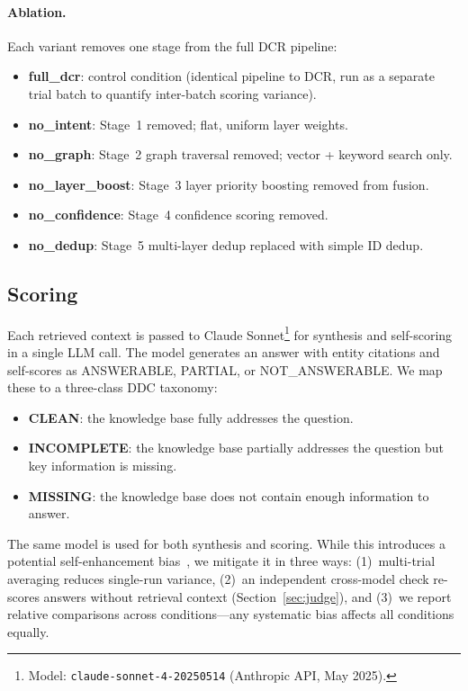 \documentclass[11pt,a4paper]{article}
\begin{document}
\paragraph{Ablation.} Each variant removes one stage from the full DCR pipeline:
\begin{itemize}[nosep]
  \item \textbf{full\_dcr}: control condition (identical pipeline to DCR, run as a separate trial batch to quantify inter-batch scoring variance).
  \item \textbf{no\_intent}: Stage~1 removed; flat, uniform layer weights.
  \item \textbf{no\_graph}: Stage~2 graph traversal removed; vector + keyword search only.
  \item \textbf{no\_layer\_boost}: Stage~3 layer priority boosting removed from fusion.
  \item \textbf{no\_confidence}: Stage~4 confidence scoring removed.
  \item \textbf{no\_dedup}: Stage~5 multi-layer dedup replaced with simple ID dedup.
\end{itemize}

\subsection{Scoring}
\label{sec:scoring}

Each retrieved context is passed to Claude Sonnet\footnote{Model: \texttt{claude-sonnet-4-20250514} (Anthropic API, May 2025).} for synthesis and self-scoring in a single LLM call. The model generates an answer with entity citations and self-scores as ANSWERABLE, PARTIAL, or NOT\_ANSWERABLE. We map these to a three-class DDC taxonomy:

\begin{itemize}[nosep]
  \item \textbf{CLEAN}: the knowledge base fully addresses the question.
  \item \textbf{INCOMPLETE}: the knowledge base partially addresses the question but key information is missing.
  \item \textbf{MISSING}: the knowledge base does not contain enough information to answer.
\end{itemize}

The same model is used for both synthesis and scoring. While this introduces a potential self-enhancement bias~\citep{zheng2023judging}, we mitigate it in three ways: (1)~multi-trial averaging reduces single-run variance, (2)~an independent cross-model check re-scores answers without retrieval context (Section~\ref{sec:judge}), and (3)~we report relative comparisons across conditions---any systematic bias affects all conditions equally.
\end{document}
